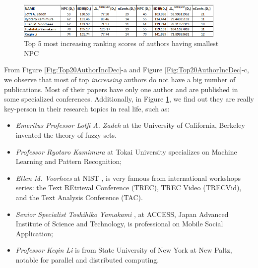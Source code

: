 \documentclass[10pt,leqno,twoside]{article}
\begin{document}
%
%
\begin{figure} %
	\caption{Top 5 most increasing ranking scores of authors having smallest NPC}
	\label{Fig:Top5AuthorInc}
    \centering
    \includegraphics[width=0.9\textwidth]{T5ainc}
\end{figure}
%
From Figure \ref{Fig:Top20AuthorIncDec}-a and Figure \ref{Fig:Top20AuthorIncDec}-c, we observe that most of top \textit{increasing} authors do not have a big number of publications. Most of their papers have only one author and are published in some specialized conferences. Additionally, in Figure \ref{Fig:Top5AuthorInc}, we find out they are really key-person in their research topics in real life, such as:
\begin{itemize}
\item \textit{Emeritus Professor  Lotfi A. Zadeh} %
at the University of California, Berkeley invented the theory of fuzzy sets.
\item \textit{Professor Ryotaro Kamimura} at Tokai University %
specializes on Machine Learning and Pattern Recognition;
\item \textit{Ellen M. Voorhees} at NIST%
, is very famous from international workshops series: the Text REtrieval Conference (TREC), TREC Video (TRECVid), and the Text Analysis Conference (TAC).
\item \textit{Senior Specialist Toshihiko Yamakami}%
, at ACCESS, Japan Advanced Institute of Science and Technology, is professional on Mobile Social Application;
\item \textit{Professor Keqin Li}
 is from State University of New York at New Paltz, notable for parallel and distributed computing.
\end{itemize}
\end{document}
